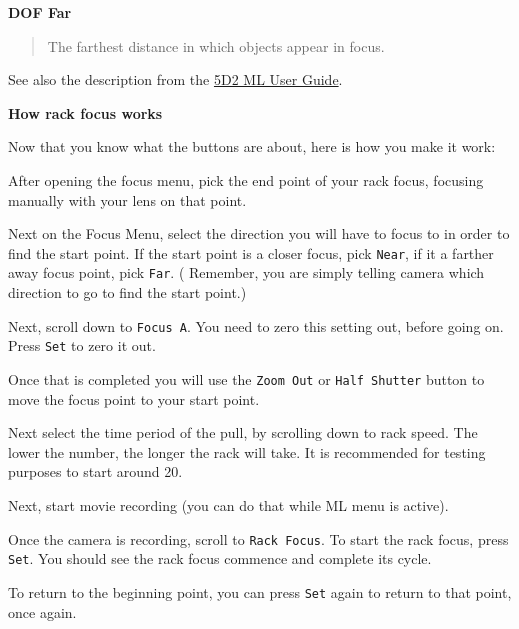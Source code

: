 \documentclass[a4paper,english]{article}
\begin{document}
\textbf{DOF Far}
%
\begin{quote}

The farthest distance in which objects appear in focus.

\end{quote}

See also the description from the \href{http://magiclantern.wikia.com/wiki/Magic_Lantern_0.1.6_User_Manual\#Focus_menu}{5D2 ML User Guide}.

\textbf{How rack focus works}

Now that you know what the buttons are about, here is how you make it work:
\begin{list}{.}
{
\setlength{\rightmargin}{\leftmargin}
}

\item After opening the focus menu, pick the end point of your rack focus, focusing manually with your lens on that point.

\item Next on the Focus Menu, select the direction you will have to focus to in order to find the start point. If the start point is a closer focus, pick \texttt{Near}, if it a farther away focus point, pick \texttt{Far}. ( Remember, you are simply telling camera which direction to go to find the start point.)

\item Next, scroll down to \texttt{Focus A}. You need to zero this setting out, before going on. Press \texttt{Set} to zero it out.

\item Once that is completed you will use the \texttt{Zoom Out} or \texttt{Half Shutter} button to move the focus point to your start point.

\item Next select the time period of the pull, by scrolling down to rack speed. The lower the number, the longer the rack will take. It is recommended for testing purposes to start around 20.

\item Next, start movie recording (you can do that while ML menu is active).

\item Once the camera is recording, scroll to \texttt{Rack Focus}. To start the rack focus, press \texttt{Set}. You should see the rack focus commence and complete its cycle.

\item To return to the beginning point, you can press \texttt{Set} again to return to that point, once again.
\end{list}
\end{document}
